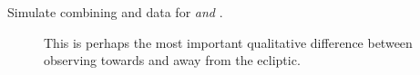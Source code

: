 \begin{description}
	\item[Simulate combining \tess and \ktwo data for \rm{\elong\:} \textit{and} \rm{\eshort}.] 
	This is perhaps the most important qualitative difference between observing towards and away from the ecliptic.
	
\end{description}

\newpage













